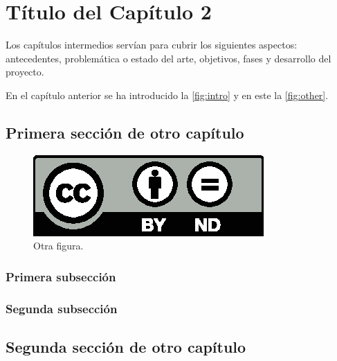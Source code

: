 \chapter{Título del Capítulo 2}
\label{ch:dos}

\noindent Los capítulos intermedios servían para cubrir los siguientes aspectos: antecedentes, problemática o estado del arte, objetivos, fases y desarrollo del proyecto.

En el capítulo anterior se ha introducido la \autoref{fig:intro} y en este la \autoref{fig:other}. 

\section{Primera sección de otro capítulo}
\label{sec:ch2_1}

\begin{figure}[htbp]
   \centering
   \includegraphics[width=0.5\linewidth]{images/licenses/by-nd}
   \caption{Otra figura.}
   \label{fig:other}
\end{figure}

\lipsum[3]

\subsection{Primera subsección}

\lipsum[4]

\subsection{Segunda subsección}

\lipsum[5]

\section{Segunda sección de otro capítulo}

\noindent \lipsum[6-7]


